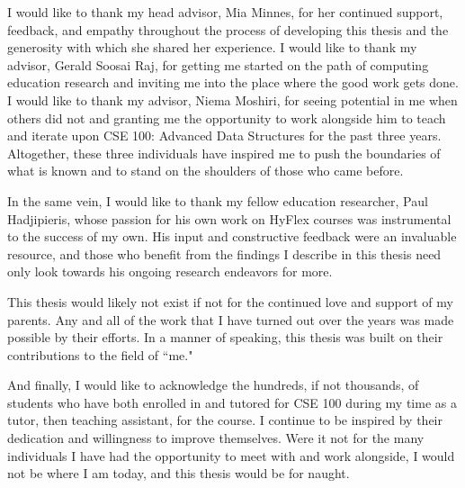 \begin{frontmatter}
%
\tableofcontents
\listoffigures  %
\listoftables   %



%
%
\begin{acknowledgements}
  I would like to thank my head advisor, Mia Minnes, for her continued support, feedback, and empathy throughout the process of developing this thesis and the generosity with which she shared her experience. I would like to thank my advisor, Gerald Soosai Raj, for getting me started on the path of computing education research and inviting me into the place where the good work gets done. I would like to thank my advisor, Niema Moshiri, for seeing potential in me when others did not and granting me the opportunity to work alongside him to teach and iterate upon CSE 100: Advanced Data Structures for the past three years. Altogether, these three individuals have inspired me to push the boundaries of what is known and to stand on the shoulders of those who came before.

  In the same vein, I would like to thank my fellow education researcher, Paul Hadjipieris, whose passion for his own work on HyFlex courses was instrumental to the success of my own. His input and constructive feedback were an invaluable resource, and those who benefit from the findings I describe in this thesis need only look towards his ongoing research endeavors for more.

  This thesis would likely not exist if not for the continued love and support of my parents. Any and all of the work that I have turned out over the years was made possible by their efforts. In a manner of speaking, this thesis was built on their contributions to the field of ``me."

  And finally, I would like to acknowledge the hundreds, if not thousands, of students who have both enrolled in and tutored for CSE 100 during my time as a tutor, then teaching assistant, for the course. I continue to be inspired by their dedication and willingness to improve themselves. Were it not for the many individuals I have had the opportunity to meet with and work alongside, I would not be where I am today, and this thesis would be for naught.
\end{acknowledgements}



\end{frontmatter}
